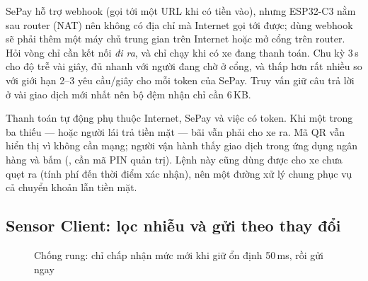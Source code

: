 \begin{lydo}
SePay hỗ trợ webhook (gọi tới một URL khi có tiền vào), nhưng ESP32-C3 nằm sau router
(NAT) nên không có địa chỉ mà Internet gọi tới được; dùng webhook sẽ phải thêm một máy
chủ trung gian trên Internet hoặc mở cổng trên router. Hỏi vòng chỉ cần kết nối
\emph{đi ra}, và chỉ chạy khi có xe đang thanh toán. Chu kỳ 3\,s cho độ trễ vài giây,
đủ nhanh với người đang chờ ở cổng, và thấp hơn rất nhiều so với giới hạn 2–3 yêu
cầu/giây cho mỗi token của SePay. Truy vấn  giữ câu trả lời ở vài giao
dịch mới nhất nên bộ đệm nhận chỉ cần 6\,KB.
\end{lydo}

\begin{lydo}
Thanh toán tự động phụ thuộc Internet, SePay và việc có token. Khi một trong ba thiếu
— hoặc người lái trả tiền mặt — bãi vẫn phải cho xe ra. Mã QR vẫn hiển thị vì không cần
mạng; người vận hành thấy giao dịch trong ứng dụng ngân hàng và bấm 
(, cần mã PIN quản trị). Lệnh này cũng dùng được cho xe
chưa quẹt ra (tính phí đến thời điểm xác nhận), nên một đường xử lý chung phục vụ cả
chuyển khoản lẫn tiền mặt.
\end{lydo}

\subsection{Sensor Client: lọc nhiễu và gửi theo thay đổi}
\begin{figure}[H]
\centering
{}
\caption{Chống rung: chỉ chấp nhận mức mới khi giữ ổn định 50\,ms, rồi gửi ngay}\label{fig:debounce}
\end{figure}

